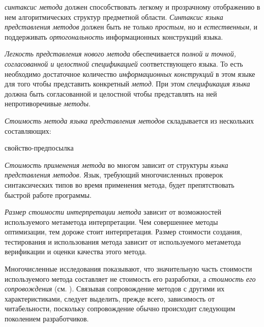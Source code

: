 \textit{синтаксис метода} должен способствовать легкому и прозрачному отображению в нем алгоритмических структур предметной области. \textit{Синтаксис языка представления методов} должен быть не только \textit{простым}, но и \textit{естественным}, и поддерживать \textit{ортогональность} информационных конструкций языка.

\textit{Легкость представления нового метода} обеспечивается \textit{полной и точной, согласованной и целостной спецификацией} соответствующего языка. То есть необходимо достаточное количество \textit{информационных конструкций} в этом языке для того чтобы представить конкретный \textit{метод}. При этом \textit{спецификация языка} должна быть согласованной и целостной чтобы представлять на ней непротиворечивые \textit{методы}.

\textit{Стоимость метода языка представления методов} складывается из нескольких составляющих:

\begin{SCn}
\begin{scnrelfromlist}{свойство-предпосылка}
\end{scnrelfromlist}
\end{SCn}

\textit{Стоимость применения метода} во многом зависит от структуры \textit{языка представления методов}. Язык, требующий многочисленных проверок синтаксических типов во время применения метода, будет препятствовать быстрой работе программы.

\textit{Размер стоимости интерпретации метода} зависит от возможностей используемого метаметода интерпретации. Чем совершеннее методы оптимизации, тем дороже стоит интерпретация.
Размер стоимости создания, тестирования и использования метода зависит от используемого метаметода верификации и оценки качества этого метода.

Многочисленные исследования показывают, что значительную часть стоимости используемого метода составляет не стоимость его разработки, а \textit{стоимость его сопровождения} (см. ). Связывая сопровождение методов с другими их характеристиками, следует выделить, прежде всего, зависимость от читабельности, поскольку сопровождение обычно происходит следующим поколением разработчиков.

